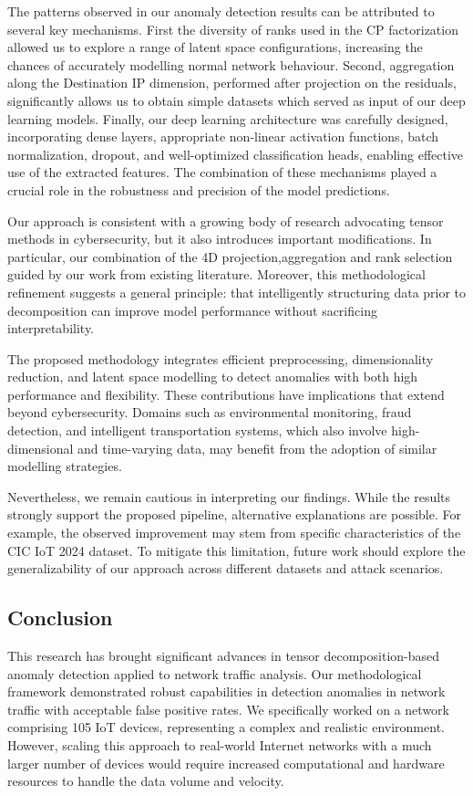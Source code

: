 \documentclass[preprint,12pt,authoryear]{elsarticle}
\begin{document}
The patterns observed in our anomaly detection results can be attributed to several key mechanisms. First the diversity of ranks used in the CP factorization allowed us to explore a range of latent space configurations, increasing the chances of accurately modelling normal network behaviour. Second, aggregation along the Destination IP dimension, performed after projection on the residuals, significantly allows us to obtain simple datasets which served as input of our deep learning models. Finally, our deep learning architecture was carefully designed, incorporating dense layers, appropriate non-linear activation functions, batch normalization, dropout, and well-optimized classification heads, enabling effective use of the extracted features. The combination of these mechanisms played a crucial role in the robustness and precision of the model predictions.

Our approach is consistent with a growing body of research advocating tensor methods in cybersecurity, but it also introduces important modifications. In particular, our combination of the 4D projection,aggregation and rank  selection guided by  our work from existing literature. Moreover, this methodological refinement suggests a general principle: that intelligently structuring data prior to decomposition can improve model performance without sacrificing interpretability.

The proposed methodology integrates efficient preprocessing, dimensionality reduction, and latent space modelling to detect anomalies with both high performance and flexibility. These contributions have implications that extend beyond cybersecurity. Domains such as environmental monitoring, fraud detection, and intelligent transportation systems, which also involve high-dimensional and time-varying data, may benefit from the adoption of similar modelling strategies.



Nevertheless, we remain cautious in interpreting our findings. While the results strongly support the proposed pipeline, alternative explanations are possible. For example, the observed improvement may stem from specific characteristics of the CIC IoT 2024 dataset. To mitigate this limitation, future work should explore the generalizability of our approach across different datasets and attack scenarios.

\subsection{Conclusion}
This research has brought significant advances in tensor decomposition-based anomaly detection applied to network traffic analysis. Our methodological framework demonstrated robust capabilities in  detection anomalies in network traffic with acceptable false positive rates. We specifically worked on a network comprising 105 IoT devices, representing a complex and realistic environment. However, scaling this approach to real-world Internet networks with a much larger number of devices would require increased computational and hardware resources to handle the data volume and velocity. 
\end{document}
